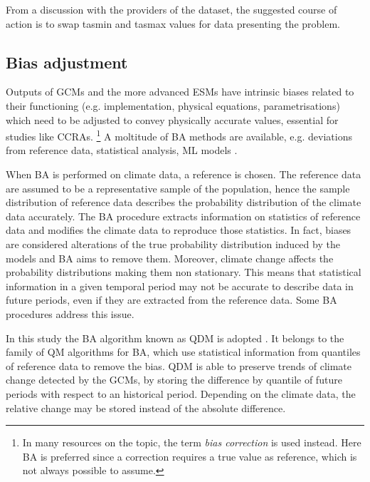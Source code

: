 From a discussion with the providers of the dataset, the suggested course of action is to swap \gls{tasmin} and \gls{tasmax} values for data presenting the problem.



\subsection{Bias adjustment}
Outputs of \glspl{GCM} and the more advanced \glspl{ESM} have intrinsic biases related to their functioning (e.g. implementation, physical equations, parametrisations) which need to be adjusted to convey physically accurate values, essential for studies like \glspl{CCRA}.%
\footnote{In many resources on the topic, the term \emph{bias correction} is used instead. Here \gls{BA} is preferred since a correction requires a true value as reference, which is not always possible to assume.}
A moltitude of \gls{BA} methods are available, e.g. deviations from reference data, statistical analysis, \gls{ML} models \cite{2015CannonBiasCorrection,2010PianiStatisticalBias12,2023NiazkarBiasCorrection}.

When \gls{BA} is performed on climate data, a reference is chosen. The reference data are assumed to be a representative sample of the population, hence the sample distribution of reference data describes the probability distribution of the climate data accurately. The \gls{BA} procedure extracts information on statistics of reference data and modifies the climate data to reproduce those statistics. In fact, biases are considered alterations of the true probability distribution induced by the models and \gls{BA} aims to remove them.
Moreover, climate change affects the probability distributions making them non stationary. This means that statistical information in a given temporal period may not be accurate to describe data in future periods, even if they are extracted from the reference data. Some \gls{BA} procedures address this issue.

In this study the \gls{BA} algorithm known as \gls{QDM} is adopted \cite{2015CannonBiasCorrection}. It belongs to the family of \gls{QM} algorithms for \gls{BA}, which use statistical information from quantiles of reference data to remove the bias. \Gls{QDM} is able to preserve trends of climate change detected by the \glspl{GCM}, by storing the difference by quantile of future periods with respect to an historical period. Depending on the climate data, the relative change may be stored instead of the absolute difference.

